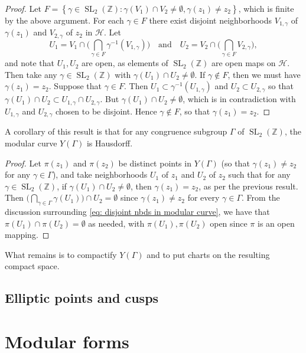 \documentclass[10pt,leqno]{article}
\newcommand{\cbr}[1]{\left\{#1\right\}}
\DeclareMathOperator{\SL}{SL}
\begin{document}
\begin{proof}
    Let $F = \cbr{\gamma\in \SL_2(\mathbb{Z}): \gamma(V_1)\cap V_2\neq \emptyset, \gamma(z_1)\neq z_2}$, which is finite by the above argument. For each $\gamma \in F$ there exist disjoint neighborhoods $V_{1,\gamma}$ of $\gamma(z_1)$ and $V_{2,\gamma}$ of $z_2$ in $\mathcal H$. Let \[U_1 = V_1\cap \Bigg(\bigcap_{\gamma\in F}\gamma^{-1}(V_{1,\gamma})\Bigg)\quad\text{and}\quad U_2 = V_2\cap \Bigg(\bigcap_{\gamma\in F}V_{2,\gamma}\Bigg),\] and note that $U_1,U_2$ are open, as elements of $\SL_2(\mathbb{Z})$ are open maps on $\mathcal H$. Then take any $\gamma\in \SL_2(\mathbb{Z})$ with $\gamma(U_1)\cap U_2\neq \emptyset$. If $\gamma\not\in F$, then we must have $\gamma(z_1) = z_2$. Suppose that $\gamma\in F$. Then $U_1\subset \gamma^{-1}(U_{1,\gamma})$ and $U_2\subset U_{2,\gamma}$ so that $ \gamma(U_1)\cap U_2\subset U_{1,\gamma}\cap U_{2,\gamma}$. But $\gamma(U_1)\cap U_2\neq \emptyset$, which is in contradiction with $U_{1,\gamma}$ and $U_{2,\gamma}$ chosen to be disjoint. Hence $\gamma\not\in F$, so that $\gamma(z_1)= z_2$.
\end{proof}

A corollary of this result is that for any congruence subgroup $\varGamma$ of $\SL_2(\mathbb{Z})$, the modular curve $Y(\varGamma)$ is Hausdorff. 
\begin{proof}
    Let $\pi(z_1)$ and $\pi(z_2)$ be distinct points in $Y(\varGamma)$ (so that $\gamma(z_1)\neq z_2$ for any $\gamma\in \varGamma$), and take neighborhoods $U_1$ of $z_1$ and $U_2$ of $z_2$ such that for any $\gamma\in \SL_2(\mathbb{Z})$, if $\gamma(U_1)\cap U_2\neq \emptyset$, then $\gamma(z_1) = z_2$, as per the previous result. Then $\big(\bigcap_{\gamma\in\varGamma}\gamma(U_1)\big)\cap U_2 = \emptyset$ since $\gamma(z_1)\neq z_2$ for every $\gamma\in \varGamma$. From the discussion surrounding \cref{eq: disjoint nbds in modular curve}, we have that $\pi(U_1)\cap\pi(U_2) = \emptyset$ as needed, with $\pi(U_1),\pi(U_2)$ open since $\pi$ is an open mapping.
\end{proof} 

What remains is to compactify $Y(\varGamma)$ and to put charts on the resulting compact space.


\subsection{Elliptic points and cusps}

\newpage\section{Modular forms}
\end{document}
